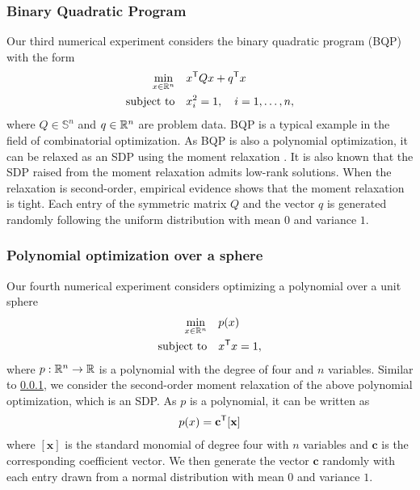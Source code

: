 \documentclass[11pt]{article}
\begin{document}
\subsubsection{Binary Quadratic Program}
\label{apx:subsection:BQP}
Our third numerical experiment considers the binary quadratic program (BQP) with the form 
\begin{align*}
 \min_{x \in \mathbb{R}^n} \quad &x^{\mathsf{ T}} Q x + q^{\mathsf{ T}} x \\
\text{subject~to} \quad & x_i^2 = 1, \quad i = 1, \ldots, n,
\end{align*}
where $Q \in \mathbb{S}^n$ and $q \in \mathbb{R}^n$ are problem data. BQP is a typical example in the field of combinatorial optimization. As BQP is also a polynomial optimization, it can be relaxed as an SDP using the moment relaxation \cite{lasserre2001global}. It is also known that the SDP raised from the moment relaxation admits low-rank solutions. When the relaxation is second-order, empirical evidence shows that the moment relaxation is tight. Each entry of the symmetric matrix $Q$ and the vector $q$ is generated randomly following the uniform distribution with mean $0$ and variance $1$.  


\subsubsection{Polynomial optimization over a sphere}
Our fourth numerical experiment considers optimizing a polynomial over a unit sphere 
\begin{align*}
 \min_{x\in \mathbb{R}^n} \quad & p(x)  \\
\text{subject~to} \quad & x^{\mathsf{ T}} x = 1,
\end{align*}
where $p:\mathbb{R}^n \to \mathbb{R}$ is a polynomial with the degree of four and $n$ variables. Similar to \cref{apx:subsection:BQP}, we consider the second-order moment relaxation of the above polynomial optimization, which is an SDP. As $p$ is a polynomial, it can be written as 
\begin{align*}
    p(x) = \mathbf{c}^{\mathsf{ T}} [\mathbf{x}]
\end{align*}
where $[\mathbf{x}]$ is the standard monomial of degree four with $n$ variables and $\mathbf{c}$ is the corresponding coefficient vector. We then generate the vector $\mathbf{c}$ randomly with each entry drawn from a normal distribution with mean $0$ and variance $1$.
\end{document}
